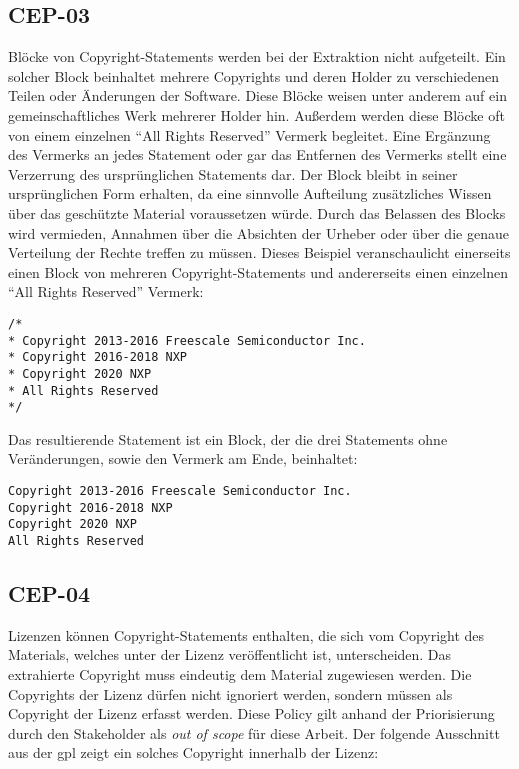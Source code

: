 \subsection{CEP-03}\label{subsec:cep-03}

Blöcke von Copyright-Statements werden bei der Extraktion nicht aufgeteilt.
Ein solcher Block beinhaltet mehrere Copyrights und deren Holder zu verschiedenen Teilen oder Änderungen der Software.
Diese Blöcke weisen unter anderem auf ein gemeinschaftliches Werk mehrerer Holder hin.
Außerdem werden diese Blöcke oft von einem einzelnen \enquote{All Rights Reserved} Vermerk begleitet.
Eine Ergänzung des Vermerks an jedes Statement oder gar das Entfernen des Vermerks stellt eine Verzerrung des ursprünglichen Statements dar.
Der Block bleibt in seiner ursprünglichen Form erhalten, da eine sinnvolle Aufteilung zusätzliches Wissen über das geschützte Material voraussetzen würde.
Durch das Belassen des Blocks wird vermieden, Annahmen über die Absichten der Urheber oder über die genaue Verteilung der Rechte treffen zu müssen.
Dieses Beispiel veranschaulicht einerseits einen Block von mehreren Copyright-Statements und andererseits einen einzelnen \enquote{All Rights Reserved} Vermerk:

\begin{lstlisting}[keepspaces=true]
/*
* Copyright 2013-2016 Freescale Semiconductor Inc.
* Copyright 2016-2018 NXP
* Copyright 2020 NXP
* All Rights Reserved
*/
\end{lstlisting}

Das resultierende Statement ist ein Block, der die drei Statements ohne Veränderungen, sowie den Vermerk am Ende, beinhaltet:

\begin{lstlisting}[keepspaces=true]
Copyright 2013-2016 Freescale Semiconductor Inc.
Copyright 2016-2018 NXP
Copyright 2020 NXP
All Rights Reserved
\end{lstlisting}


\subsection{CEP-04}\label{subsec:cep-04}

Lizenzen können Copyright-Statements enthalten, die sich vom Copyright des Materials, welches unter der Lizenz veröffentlicht ist, unterscheiden.
Das extrahierte Copyright muss eindeutig dem Material zugewiesen werden.
Die Copyrights der Lizenz dürfen nicht ignoriert werden, sondern müssen als Copyright der Lizenz erfasst werden.
Diese Policy gilt anhand der Priorisierung durch den Stakeholder als \textit{out of scope} für diese Arbeit.
Der folgende Ausschnitt aus der \gls{gpl} zeigt ein solches Copyright innerhalb der Lizenz:

